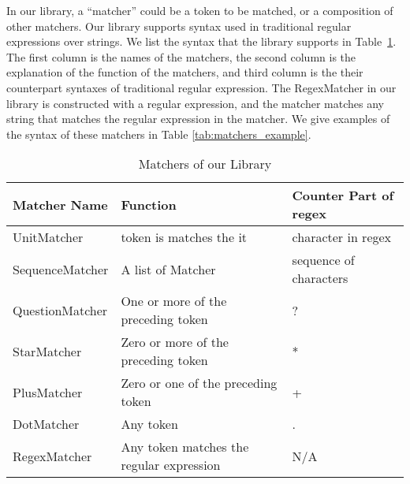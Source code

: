In our library, a ``matcher'' could be a token to be matched, or a composition of other matchers. Our library supports syntax used in traditional regular expressions over strings. We list the syntax that the library supports in Table~\ref{tab:matchers}. The first column is the names of the matchers, the second column is the explanation of the function of the matchers, and third column is the their counterpart syntaxes of traditional regular expression. The RegexMatcher in our library is constructed with a regular expression, and the matcher matches any string that matches the regular expression in the matcher. We give examples of the syntax of these matchers in Table \ref{tab:matchers_example}.

\begin{table}[ht]
\caption{Matchers of our Library } %
\centering %
\begin{tabular}{  | l | l | l |  }
 \hline
 Matcher Name      &  Function                                 & Counter Part of regex    \\
 \hline
 UnitMatcher       &  token is matches the it                  & character  in regex       \\
 \hline
 SequenceMatcher   &  A list of Matcher                        & sequence of characters       \\
  \hline
 QuestionMatcher   &  One or more of the preceding token       & ?       \\
  \hline
 StarMatcher       &  Zero or more of the preceding token      & *       \\
  \hline
 PlusMatcher       &  Zero or one of the preceding token       & +       \\
  \hline
 DotMatcher        &  Any token                                & .      \\
  \hline
 RegexMatcher      &  Any token matches the regular expression               &  N/A      \\
  \hline
\end{tabular}
\label{tab:matchers} %
\end{table}




